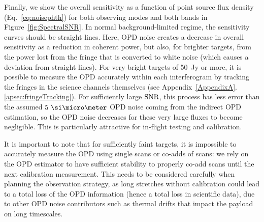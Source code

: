 Finally, we show the overall sensitivity as a function of point source flux density (Eq.~\ref{eq:noisephth}) for both observing modes and both bands in Figure~\ref{fig:SpectralSNR}. In normal background-limited regime, the sensitivity curves should be straight lines. Here, OPD noise creates a decrease in overall sensitivity as a reduction in coherent power, but also, for brighter targets, from the power lost from the fringe that is converted to white noise (which causes a deviation from straight lines). For very bright targets of 50~Jy or more, it is possible to measure the OPD accurately within each interferogram by tracking the fringes in the science channels themselves (see Appendix~\ref{AppendixA}.\ref{apsec:fringeTracking}). For sufficiently large $\textrm{SNR}$, this process has less error than the assumed $5~\um$ OPD noise coming from the indirect OPD estimation, so the OPD noise decreases for these very large fluxes to become negligible. This is particularly attractive for in-flight testing and calibration.

It is important to note that for sufficiently faint targets, it is impossible to accurately measure the OPD using single scans or co-adds of scans: we rely on the OPD estimator to have sufficient stability to properly co-add scans until the next calibration measurement. This needs to be considered carefully when planning the observation strategy, as long stretches without calibration could lead to a total loss of the OPD information (hence a total loss in scientific data), due to other OPD noise contributors such as thermal drifts that impact the payload on long timescales.



